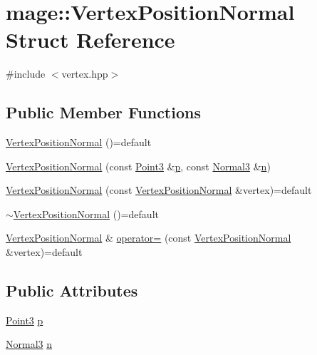 \hypertarget{structmage_1_1_vertex_position_normal}{}\section{mage\+:\+:Vertex\+Position\+Normal Struct Reference}
\label{structmage_1_1_vertex_position_normal}


{\ttfamily \#include $<$vertex.\+hpp$>$}

\subsection*{Public Member Functions}
\begin{DoxyCompactItemize}
\item 
\hyperlink{structmage_1_1_vertex_position_normal_a470e35daf194befbf45ac3ecfd6848e3}{Vertex\+Position\+Normal} ()=default
\item 
\hyperlink{structmage_1_1_vertex_position_normal_ad2fc50a2050b9a7c961e1bd98d736710}{Vertex\+Position\+Normal} (const \hyperlink{structmage_1_1_point3}{Point3} \&\hyperlink{structmage_1_1_vertex_position_normal_ac95e9941363ec5687f0bf21e59b83940}{p}, const \hyperlink{structmage_1_1_normal3}{Normal3} \&\hyperlink{structmage_1_1_vertex_position_normal_a09baa618081e66e21cdfe5752dbf8df6}{n})
\item 
\hyperlink{structmage_1_1_vertex_position_normal_a9a0bb5edf57cc8b4e97b32a6eda1be93}{Vertex\+Position\+Normal} (const \hyperlink{structmage_1_1_vertex_position_normal}{Vertex\+Position\+Normal} \&vertex)=default
\item 
\hyperlink{structmage_1_1_vertex_position_normal_a664123217b7e8d18769ea46fc318e0c1}{$\sim$\+Vertex\+Position\+Normal} ()=default
\item 
\hyperlink{structmage_1_1_vertex_position_normal}{Vertex\+Position\+Normal} \& \hyperlink{structmage_1_1_vertex_position_normal_a43c666c745b5807afddf87049ace0ef1}{operator=} (const \hyperlink{structmage_1_1_vertex_position_normal}{Vertex\+Position\+Normal} \&vertex)=default
\end{DoxyCompactItemize}
\subsection*{Public Attributes}
\begin{DoxyCompactItemize}
\item 
\hyperlink{structmage_1_1_point3}{Point3} \hyperlink{structmage_1_1_vertex_position_normal_ac95e9941363ec5687f0bf21e59b83940}{p}
\item 
\hyperlink{structmage_1_1_normal3}{Normal3} \hyperlink{structmage_1_1_vertex_position_normal_a09baa618081e66e21cdfe5752dbf8df6}{n}
\end{DoxyCompactItemize}
